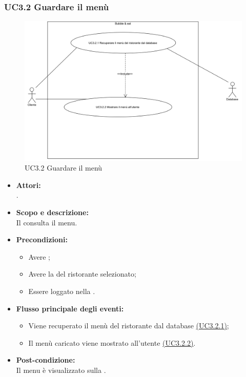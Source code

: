 \subsubsection{UC3.2 Guardare il menù} \label{UC3.2}

\begin{figure}[H]
	\centering
	\includegraphics[width=15cm]{../../documenti/AnalisiDeiRequisiti/Diagrammi_img/uc3_2.png}
	\caption{UC3.2 Guardare il menù}
\end{figure}

\begin{itemize}
	\item \textbf{Attori:}
	\\.
	\item \textbf{Scopo e descrizione:} 
	\\Il {} consulta il menu.
	\item \textbf{Precondizioni:}
	\begin{itemize}
		\item Avere ;
		\item Avere la  del ristorante selezionato;
		\item Essere loggato nella .
	\end{itemize}
	\item \textbf{Flusso principale degli eventi:}
	\begin{itemize}
		\item Viene recuperato il menù del ristorante dal database \hyperref[UC3.2.1]{(UC3.2.1)};
		\item Il menù caricato viene mostrato all'utente \hyperref[UC3.2.2]{(UC3.2.2)}.
	\end{itemize}
	\item \textbf{Post-condizione:}
	\\Il menu è visualizzato sulla .
\end{itemize}

